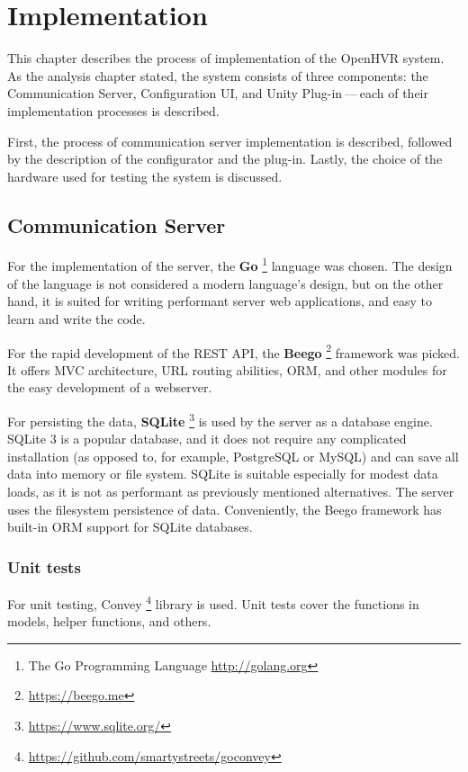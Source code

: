 \chapter{Implementation}

This chapter describes the process of implementation of the OpenHVR system.
As the analysis chapter stated, the system consists of three components: the
Communication Server, Configuration UI, and Unity Plug-in — each of their
implementation processes is described.


First, the process of communication server implementation is described,
followed by the description of the configurator and the plug-in. Lastly, the choice
of the hardware used for testing the system is discussed.


\hypertarget{x-communication-server}{\section{Communication Server}}
For the implementation of the server, the
\textbf{Go} \footnote{The Go Programming Language \href{http://golang.org}{http://golang.org}} language was
chosen. The design of the language is not considered a modern
language’s design, but on the other hand, it is
suited for writing performant server web applications, and easy
to learn and write the code. \cite{gogbu}


For the rapid development of the REST API, the \textbf{Beego} \footnote{\href{https://beego.me}{https://beego.me}}
framework was picked. It offers MVC architecture, URL routing abilities, ORM,
and other modules for the easy development of a webserver.


For persisting the data, \textbf{SQLite} \footnote{\href{https://www.sqlite.org/}{https://www.sqlite.org/}}
is used by the server as a database engine. SQLite 3 is
a popular database, and it does not require any complicated installation
(as opposed to, for example, PostgreSQL or MySQL) and can save all data into
memory or file system. SQLite is suitable especially for modest data loads, as
it is not as performant as previously mentioned alternatives. The server uses the
filesystem persistence of data. Conveniently, the Beego framework has built-in
ORM support for SQLite databases.


\hypertarget{x-unit-tests}{\subsection{Unit tests}}
For unit testing, Convey \footnote{\href{https://github.com/smartystreets/goconvey}{https://github.com/smartystreets/goconvey}}
library is used. Unit tests cover the functions in models, helper functions,
and others.


